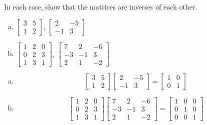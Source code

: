 \documentclass[../main.tex]{subfiles}
\begin{document}
In each case, show that the matrices are inverses of each other.
\begin{enumerate}[a)]
	\item
		$\left[\begin{array}{rr}
			3 & 5 \\
			1 & 2
		\end{array}\right]$,
		$\left[\begin{array}{rr}
			2 & -5 \\
			-1 & 3
		\end{array}\right]$
	\setcounter{enumi}{2}
	\item 
		$\left[\begin{array}{rrr}
			1 & 2 & 0 \\
			0 & 2 & 3 \\
			1 & 3 & 1
		\end{array}\right]$,
		$\left[\begin{array}{rrr}
			7 & 2 & -6 \\
			-3 & -1 & 3 \\
			2 & 1 & -2
		\end{array}\right]$
\end{enumerate}

\solution

\begin{enumerate}[a)]
    \item
        
		\[\left[\begin{array}{rr}
			3 & 5 \\
			1 & 2
		\end{array}\right]
		\left[\begin{array}{rr}
			2 & -5 \\
			-1 & 3
		\end{array}\right] = 
		\left[\begin{array}{rr}
			1 & 0 \\
			0 & 1
		\end{array}\right]
        \]
    \setcounter{enumi}{2}
    \item
        
		\[\left[\begin{array}{rrr}
			1 & 2 & 0 \\
			0 & 2 & 3 \\
			1 & 3 & 1
		\end{array}\right]
		\left[\begin{array}{rrr}
			7 & 2 & -6 \\
			-3 & -1 & 3 \\
			2 & 1 & -2
		\end{array}\right] =
		\left[\begin{array}{rrr}
			1 & 0 & 0 \\
			0 & 1 & 0 \\
			0 & 0 & 1
		\end{array}\right]
        \]
\end{enumerate}
\end{document}
